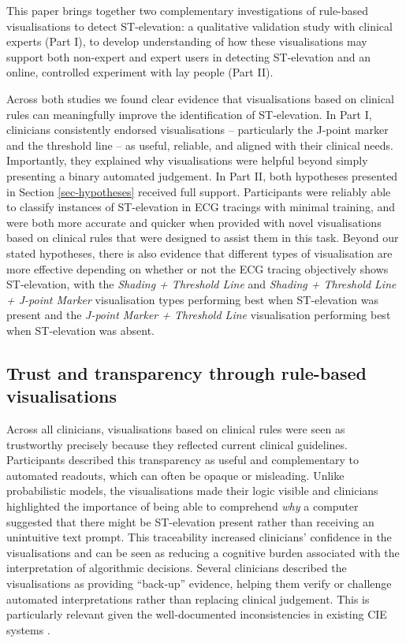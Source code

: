 \documentclass[
  10pt,
  letterpaper,
]{article}
\begin{document}
This paper brings together two complementary investigations of
rule-based visualisations to detect ST-elevation: a qualitative
validation study with clinical experts (Part I), to develop
understanding of how these visualisations may support both non-expert
and expert users in detecting ST-elevation and an online, controlled
experiment with lay people (Part II).

Across both studies we found clear evidence that visualisations based on
clinical rules can meaningfully improve the identification of
ST-elevation. In Part I, clinicians consistently endorsed visualisations
-- particularly the J-point marker and the threshold line -- as useful,
reliable, and aligned with their clinical needs. Importantly, they
explained why visualisations were helpful beyond simply presenting a
binary automated judgement. In Part II, both hypotheses presented in
Section \ref{sec-hypotheses} received full support. Participants were
reliably able to classify instances of ST-elevation in ECG tracings with
minimal training, and were both more accurate and quicker when provided
with novel visualisations based on clinical rules that were designed to
assist them in this task. Beyond our stated hypotheses, there is also
evidence that different types of visualisation are more effective
depending on whether or not the ECG tracing objectively shows
ST-elevation, with the \emph{Shading + Threshold Line} and
\emph{Shading + Threshold Line + J-point Marker} visualisation types
performing best when ST-elevation was present and the
\emph{J-point Marker + Threshold Line} visualisation performing best
when ST-elevation was absent.

\subsection{Trust and transparency through rule-based
visualisations}\label{trust-and-transparency-through-rule-based-visualisations}

Across all clinicians, visualisations based on clinical rules were seen
as trustworthy precisely because they reflected current clinical
guidelines. Participants described this transparency as useful and
complementary to automated readouts, which can often be opaque or
misleading. Unlike probabilistic models, the visualisations made their
logic visible and clinicians highlighted the importance of being able to
comprehend \textit{why} a computer suggested that there might be
ST-elevation present rather than receiving an unintuitive text prompt.
This traceability increased clinicians' confidence in the visualisations
and can be seen as reducing a cognitive burden associated with the
interpretation of algorithmic decisions. Several clinicians described
the visualisations as providing ``back‑up'' evidence, helping them
verify or challenge automated interpretations rather than replacing
clinical judgement. This is particularly relevant given the
well‑documented inconsistencies in existing CIE systems
\cite{smulyan_computerized_2019, schlapfer_computer-interpreted_2017}.
\end{document}
